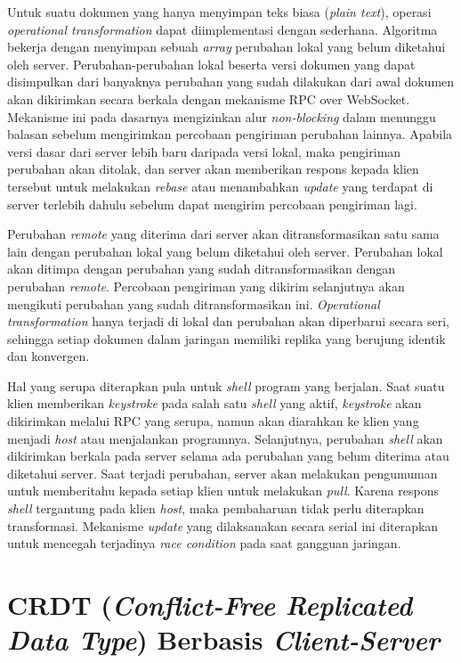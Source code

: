 Untuk suatu dokumen yang hanya menyimpan teks biasa (\textit{plain text}), operasi \textit{operational transformation} dapat diimplementasi dengan sederhana. Algoritma bekerja dengan menyimpan sebuah \textit{array} perubahan lokal yang belum diketahui oleh server. Perubahan-perubahan lokal beserta versi dokumen yang dapat disimpulkan dari banyaknya perubahan yang sudah dilakukan dari awal dokumen akan dikirimkan secara berkala dengan mekanisme RPC over WebSocket. Mekanisme ini pada dasarnya mengizinkan alur \textit{non-blocking} dalam menunggu balasan sebelum mengirimkan percobaan pengiriman perubahan lainnya. Apabila versi dasar dari server lebih baru daripada versi lokal, maka pengiriman perubahan akan ditolak, dan server akan memberikan respons kepada klien tersebut untuk melakukan \textit{rebase} atau menambahkan \textit{update} yang terdapat di server terlebih dahulu sebelum dapat mengirim percobaan pengiriman lagi.

Perubahan \textit{remote} yang diterima dari server akan ditransformasikan satu sama lain dengan perubahan lokal yang belum diketahui oleh server. Perubahan lokal akan ditimpa dengan perubahan yang sudah ditransformasikan dengan perubahan \textit{remote}. Percobaan pengiriman yang dikirim selanjutnya akan mengikuti perubahan yang sudah ditransformasikan ini. \textit{Operational transformation} hanya terjadi di lokal dan perubahan akan diperbarui secara seri, sehingga setiap dokumen dalam jaringan memiliki replika yang berujung identik dan konvergen.

Hal yang serupa diterapkan pula untuk \textit{shell} program yang berjalan. Saat suatu klien memberikan \textit{keystroke} pada salah satu \textit{shell} yang aktif, \textit{keystroke} akan dikirimkan melalui RPC yang serupa, namun akan diarahkan ke klien yang menjadi \textit{host} atau menjalankan programnya. Selanjutnya, perubahan \textit{shell} akan dikirimkan berkala pada server selama ada perubahan yang belum diterima atau diketahui server. Saat terjadi perubahan, server akan melakukan pengumuman untuk memberitahu kepada setiap klien untuk melakukan \textit{pull}.
Karena respons \textit{shell} tergantung pada klien \textit{host}, maka pembaharuan tidak perlu diterapkan transformasi. Mekanisme \textit{update} yang dilaksanakan secara serial ini diterapkan untuk mencegah terjadinya \textit{race condition} pada saat gangguan jaringan.

\section{CRDT (\textit{Conflict-Free Replicated Data Type}) Berbasis \textit{Client-Server}}

